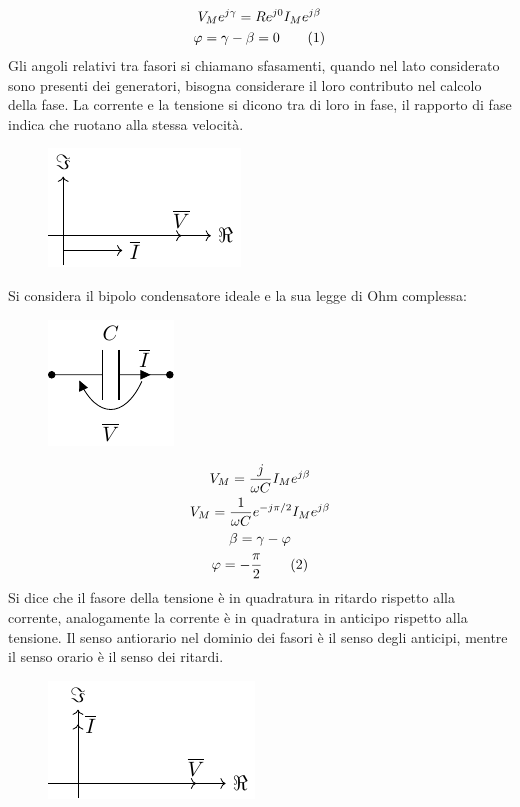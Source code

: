 \documentclass{article}
\newcommand{\tageq}{\tag{\stepcounter{equation}\theequation}}
\numberwithin{equation}{subsection}
\begin{document}
\begin{gather*}
    V_Me^{j\gamma}=Re^{j0}I_Me^{j\beta}\\
    \varphi=\gamma-\beta=0\tageq
\end{gather*}
Gli angoli relativi tra fasori si chiamano sfasamenti, quando nel lato considerato sono presenti dei generatori, bisogna 
considerare il loro contributo nel calcolo della fase. La corrente e la tensione si dicono tra di loro in fase, il rapporto di fase indica che ruotano alla stessa velocità. 
\begin{figure}[H]%
    \centering
    \includegraphics{sfasamento-resistore.pdf}%
    \label{fig:sfasamento-resistore}
\end{figure}

Si considera il bipolo condensatore ideale e la sua legge di Ohm complessa:
\begin{figure}[H]%
    \centering
    \includegraphics{condensatore-fasori.pdf}%
    \label{fig:condensatore-fasori}
\end{figure}
\begin{gather*}
    V_M=\displaystyle\frac{j}{\omega C}I_Me^{j\beta}\\
    V_M=\displaystyle\frac{1}{\omega C}e^{-j\pi/2}I_Me^{j\beta}\\
    \beta=\gamma-\varphi\\
    \varphi=\displaystyle-\frac{\pi}{2}\tageq
\end{gather*}
Si dice che il fasore della tensione è in quadratura in ritardo rispetto alla corrente, analogamente la corrente è in quadratura in anticipo rispetto alla tensione. Il 
senso antiorario nel dominio dei fasori è il senso degli anticipi, mentre il senso orario è il senso dei ritardi. 
\begin{figure}[H]%
    \centering
    \includegraphics{sfasamento-condensatore.pdf}%
    \label{fig:sfasamento-condensatore}
\end{figure}
\end{document}
